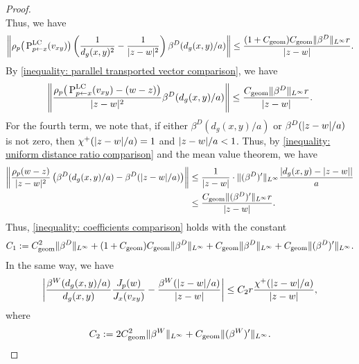 \documentclass[a4paper,oneside,12pt]{amsart}
\theoremstyle{plain}
\theoremstyle{definition}
\theoremstyle{remark}
\DeclarePairedDelimiter{\abs}{\lvert}{\rvert}
\DeclarePairedDelimiter{\norm}{\lVert}{\rVert}
\newcommand{\paralleltransport}[2]{\operatorname{P}_{#2 \gets #1}}
\newcommand{\paralleltransportLC}[2]{\paralleltransport{#1}{#2}^{\mathrm{LC}}}
\newcommand{\cliffordmultiplication}{\rho}
\newcommand{\cutoff}{\beta}
\newcommand{\cutoffDirac}{\cutoff^D}
\newcommand{\cutoffWilson}{\cutoff^W}
\newcommand{\cutoffupper}{\chi^+}
\newcommand{\constantgeometric}{C_{\mathrm{geom}}}
\begin{document}
\begin{proof}
\begin{equation}
  \end{equation}
  Thus, we have
  \begin{equation}
    \norm*{\cliffordmultiplication_p \big(\paralleltransportLC{x}{p}(v_{xy})\big) \left(\frac{1}{d_g(x,y)^2} - \frac{1}{\abs{z-w}^2}\right) \cutoffDirac(d_g(x,y)/a)} \le \frac{(1+\constantgeometric)\constantgeometric \norm{\cutoffDirac}_{L^{\infty}} r}{\abs{z-w}}.
  \end{equation}
  By \eqref{inequality: parallel transported vector comparison}, we have
  \begin{equation}
    \norm*{\frac{\cliffordmultiplication_p \big(\paralleltransportLC{x}{p}(v_{xy}) - (w-z)\big)}{\abs{z-w}^2} \cutoffDirac(d_g(x,y)/a)} \le \frac{\constantgeometric \norm{\cutoffDirac}_{L^{\infty}} r}{\abs{z-w}}.
  \end{equation}
  For the fourth term, we note that, if either $\cutoffDirac(d_g(x,y)/a)$ or $\cutoffDirac(\abs{z-w}/a)$ is not zero, then $\cutoffupper(\abs{z-w}/a) = 1$ and $\abs{z-w}/a < 1$.
  Thus, by \eqref{inequality: uniform distance ratio comparison} and the mean value theorem, we have
  \begin{equation}
    \begin{aligned}
    \norm*{\frac{\cliffordmultiplication_p(w-z)}{\abs{z-w}^2} \left(\cutoffDirac(d_g(x,y)/a) - \cutoffDirac(\abs{z-w}/a)\right)} \le{}& \frac{1}{\abs{z-w}} \cdot \norm{(\cutoffDirac)'}_{L^{\infty}} \frac{\abs*{d_g(x,y)- \abs{z-w}}}{a} \\
    \le{}& \frac{\constantgeometric \norm{(\cutoffDirac)'}_{L^{\infty}} r}{\abs{z-w}}.
    \end{aligned}
  \end{equation}
  Thus, \eqref{inequality: coefficients comparison} holds with the constant
  \begin{equation}
    C_1 := \constantgeometric^2 \norm{\cutoffDirac}_{L^{\infty}} + (1+\constantgeometric)\constantgeometric \norm{\cutoffDirac}_{L^{\infty}} + \constantgeometric \norm{\cutoffDirac}_{L^{\infty}} + \constantgeometric \norm{(\cutoffDirac)'}_{L^{\infty}}.
  \end{equation}
  In the same way, we have
  \begin{equation}
    \abs*{\frac{\cutoffWilson(d_g(x,y)/a)}{d_g(x,y)} \frac{J_p(w)}{J_x(v_{xy})} - \frac{\cutoffWilson(\abs{z-w}/a)}{\abs{z-w}}} \le C_2 r \frac{\cutoffupper(\abs{z-w}/a)}{\abs{z-w}},
  \end{equation}
  where
  \begin{equation}
    C_2 := 2 \constantgeometric^2 \norm{\cutoffWilson}_{L^{\infty}} + \constantgeometric \norm{(\cutoffWilson)'}_{L^{\infty}}.
  \end{equation}


\end{proof}
\end{document}
